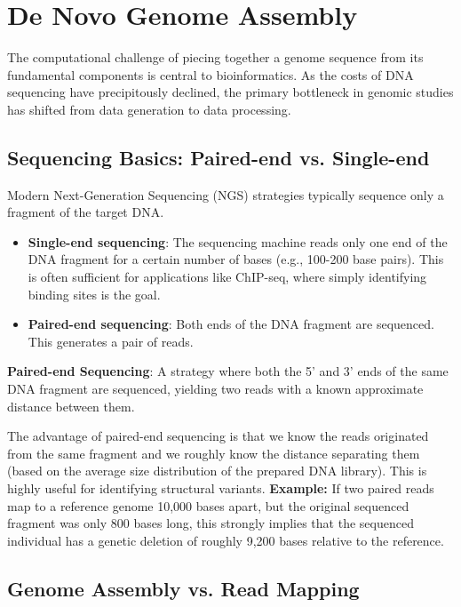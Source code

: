 \documentclass[11pt,a4paper]{article}
\newenvironment{important}{
    \vspace{1em}
    \begin{tcolorbox}[colback=blue!5!white, colframe=blue!75!black, boxrule=1pt, arc=4pt, left=10pt, right=10pt, top=10pt, bottom=10pt]
}{
    \end{tcolorbox}
    \vspace{1em}
}
\begin{document}
\section{De Novo Genome Assembly}

The computational challenge of piecing together a genome sequence from its fundamental components is central to bioinformatics. As the costs of DNA sequencing have precipitously declined, the primary bottleneck in genomic studies has shifted from data generation to data processing. 

\subsection{Sequencing Basics: Paired-end vs. Single-end}

Modern Next-Generation Sequencing (NGS) strategies typically sequence only a fragment of the target DNA.
\begin{itemize}
    \item \textbf{Single-end sequencing}: The sequencing machine reads only one end of the DNA fragment for a certain number of bases (e.g., 100-200 base pairs). This is often sufficient for applications like ChIP-seq, where simply identifying binding sites is the goal.
    \item \textbf{Paired-end sequencing}: Both ends of the DNA fragment are sequenced. This generates a pair of reads.
\end{itemize}

\begin{important}
\textbf{Paired-end Sequencing}: A strategy where both the 5' and 3' ends of the same DNA fragment are sequenced, yielding two reads with a known approximate distance between them.
\end{important}

The advantage of paired-end sequencing is that we know the reads originated from the same fragment and we roughly know the distance separating them (based on the average size distribution of the prepared DNA library). This is highly useful for identifying structural variants. 
\textbf{Example:} If two paired reads map to a reference genome 10,000 bases apart, but the original sequenced fragment was only 800 bases long, this strongly implies that the sequenced individual has a genetic deletion of roughly 9,200 bases relative to the reference. 

\subsection{Genome Assembly vs. Read Mapping}
\end{document}
